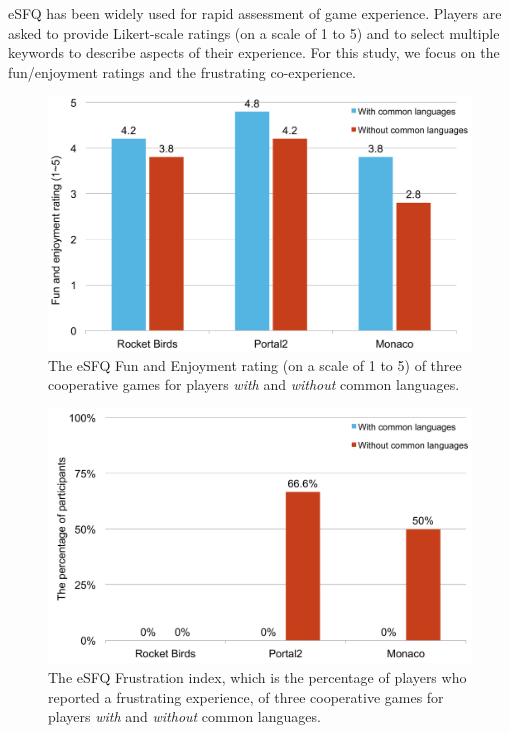 eSFQ\cite{eSFQ} has been widely used for rapid assessment of game experience. Players are asked to provide Likert-scale ratings (on a scale of 1 to 5) and to select multiple keywords to describe aspects of their experience. 
For this study, we focus on the fun/enjoyment ratings and the frustrating co-experience. 

\begin{figure}[!t]
\centering
\includegraphics[width=0.9\columnwidth]{Figures/PS_FunAndEnj.pdf}
\caption{The eSFQ Fun and Enjoyment rating (on a scale of 1 to 5) of three cooperative games for players \textit{with} and \textit{without} common languages.}
\label{fig:PS_FunAndEnj}
\end{figure}


\begin{figure}[!t]
\centering
\includegraphics[width=0.9\columnwidth]{Figures/PS_Frus.pdf}
\caption{The eSFQ Frustration index, which is the percentage of players who reported a frustrating experience, of three cooperative games for players \textit{with} and \textit{without} common languages.}
\label{fig:PS_Frus}
\end{figure}


